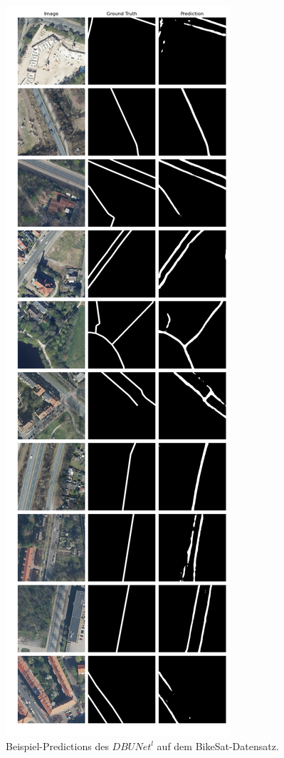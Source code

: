 \begin{figure}
	\centering
	\includegraphics[width=.41\textwidth]{Bilder/Samples-BikeSat/dbunet-l.png} 
	\caption{Beispiel-Predictions des $DBUNet^l$ auf dem BikeSat-Datensatz.}
	\label{fig:bikesat-samples-dbunet-l}
\end{figure}

